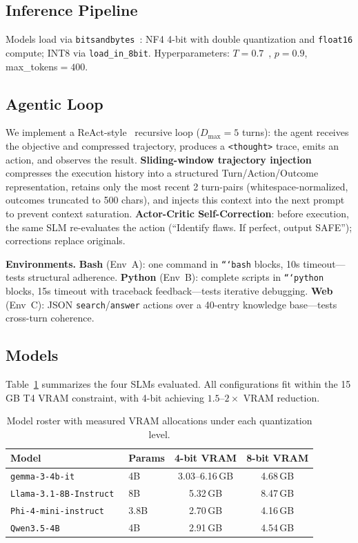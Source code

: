 \documentclass{article}
\begin{document}
\subsection{Inference Pipeline}

Models load via \texttt{bitsandbytes}~\cite{dettmers2022llm}: NF4 4-bit with double quantization and \texttt{float16} compute; INT8 via \texttt{load\_in\_8bit}. Hyperparameters: $T{=}0.7$~\cite{wang2024survey}, $p{=}0.9$, max\_tokens${=}400$.

\subsection{Agentic Loop}

We implement a ReAct-style~\cite{yao2022react} recursive loop ($D_{\max}{=}5$ turns): the agent receives the objective and compressed trajectory, produces a \texttt{<thought>} trace, emits an action, and observes the result. \textbf{Sliding-window trajectory injection} compresses the execution history into a structured Turn/Action/Outcome representation, retains only the most recent 2 turn-pairs (whitespace-normalized, outcomes truncated to 500 chars), and injects this context into the next prompt to prevent context saturation. \textbf{Actor-Critic Self-Correction}: before execution, the same SLM re-evaluates the action (``Identify flaws. If perfect, output SAFE''); corrections replace originals.

\textbf{Environments.} \textbf{Bash} (Env~A): one command in \texttt{```bash} blocks, 10s timeout---tests structural adherence. \textbf{Python} (Env~B): complete scripts in \texttt{```python} blocks, 15s timeout with traceback feedback---tests iterative debugging. \textbf{Web} (Env~C): JSON \texttt{search}/\texttt{answer} actions over a 40-entry knowledge base---tests cross-turn coherence.

\subsection{Models}

Table~\ref{tab:models} summarizes the four SLMs evaluated. All configurations fit within the 15\,GB T4 VRAM constraint, with 4-bit achieving $1.5$--$2\times$ VRAM reduction.

\begin{table}[ht]
\caption{Model roster with measured VRAM allocations under each quantization level.}
\label{tab:models}
\centering
\small
\begin{tabular}{@{}llcc@{}}
\toprule
Model & Params & 4-bit VRAM & 8-bit VRAM \\
\midrule
\texttt{gemma-3-4b-it}~\cite{gemma2025} & 4B & 3.03--6.16\,GB & 4.68\,GB \\
\texttt{Llama-3.1-8B-Instruct}~\cite{touvron2023llama} & 8B & 5.32\,GB & 8.47\,GB \\
\texttt{Phi-4-mini-instruct}~\cite{phi4mini2025} & 3.8B & 2.70\,GB & 4.16\,GB \\
\texttt{Qwen3.5-4B}~\cite{bai2023qwen} & 4B & 2.91\,GB & 4.54\,GB \\
\bottomrule
\end{tabular}
\end{table}
\end{document}
